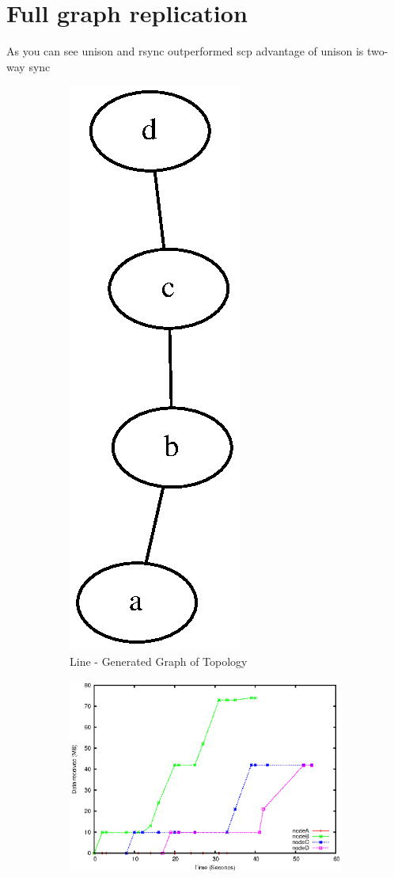 \documentclass[12pt]{article}
\begin{document}
\section{Full graph replication}
As you can see unison and rsync outperformed scp
advantage of unison is two-way sync
\begin{figure}[htp]
    \begin{subfigure}[b]{0.5\linewidth}
        \centering
        \includegraphics[scale=0.5]{images/line-graph.eps}
        \caption{Line - Generated Graph of Topology}
        \label{fig:line_graph}
    \end{subfigure}
    \begin{subfigure}[b]{0.5\linewidth}
        \centering
        \includegraphics[scale=0.5]{images/line-scp-10-fixes.eps}

\end{subfigure}
\end{figure}
\end{document}
